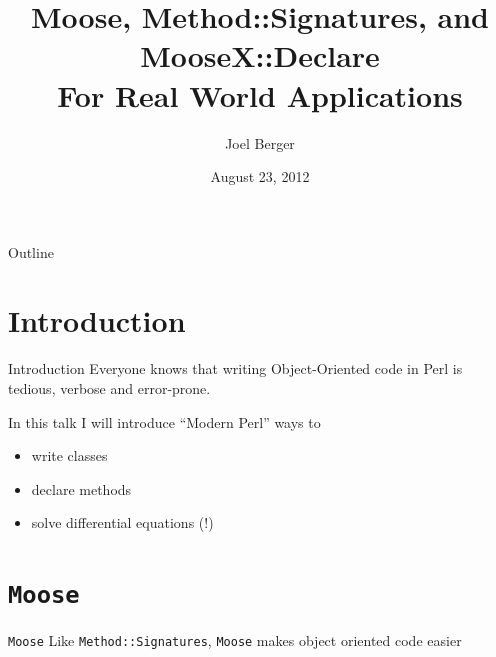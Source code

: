 \documentclass[mathserif]{beamer}
\title[Real World Moose]{Moose, Method::Signatures, and MooseX::Declare\\For Real World Applications}
\author{Joel Berger}
\institute[UIC]{University of Illinois at Chicago}
\date{August 23, 2012}
\providecommand{\code}[1]{{\texttt{\scriptsize{#1}}}}
\providecommand{\inputcode}[1]{
  \begin{block}{}
    \scriptsize{}
  \end{block}
}
\begin{document}
\begin{frame}
  \maketitle
\end{frame}

\begin{frame}{Outline}
  \tableofcontents
\end{frame}


\section{Introduction}

\begin{frame}{Introduction}
  Everyone knows that writing Object-Oriented code in Perl is tedious, verbose and error-prone.

  \begin{center}
  \end{center}

  In this talk I will introduce ``Modern Perl'' ways to
  \begin{itemize}
    \item write classes
    \item declare methods
    \item solve differential equations (!)
  \end{itemize}
\end{frame}

\section{\code{Moose}}

\begin{frame}{\texttt{Moose}}
  Like \code{Method::Signatures}, \code{Moose} makes object oriented code easier
  \inputcode{moose/person}
\end{frame}
\end{document}
